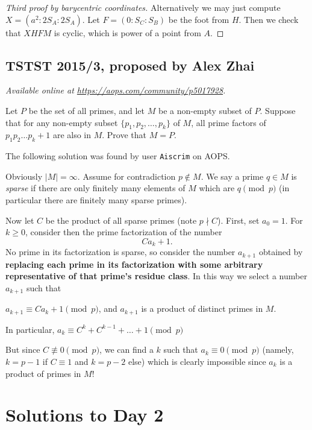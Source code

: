 \documentclass[11pt]{scrartcl}
\begin{document}
\begin{proof}
  [Third proof by barycentric coordinates]
  Alternatively we may just compute $X = (a^2:2S_A:2S_A)$.
  Let $F = (0 : S_C : S_B)$ be the foot from $H$.
  Then we check that $X H F M$ is cyclic,
  which is power of a point from $A$.
\end{proof}
\pagebreak

\subsection{TSTST 2015/3, proposed by Alex Zhai}
\textsl{Available online at \url{https://aops.com/community/p5017928}.}
\begin{mdframed}[style=mdpurplebox,frametitle={Problem statement}]
Let $P$ be the set of all primes, and let $M$ be a
non-empty subset of $P$. Suppose that for any non-empty subset
$\{p_1, p_2, \dots, p_k\}$ of $M$, all prime factors of
$p_1 p_2 \dots p_k + 1$ are also in $M$. Prove that $M = P$.
\end{mdframed}
The following solution was found by user \texttt{Aiscrim} on AOPS.

Obviously $|M| = \infty$.
Assume for contradiction $p \notin M$.
We say a prime $q \in M$ is \emph{sparse}
if there are only finitely many elements of $M$
which are $q \pmod p$
(in particular there are finitely many sparse primes).

Now let $C$ be the product of all sparse primes (note $p \nmid C$).
First, set $a_0 = 1$.
For $k \ge 0$, consider then the prime factorization of the number
\[ Ca_k + 1. \]
No prime in its factorization is sparse,
so consider the number $a_{k+1}$ obtained by
\textbf{replacing each prime in its factorization
with some arbitrary representative of that prime's residue class}.
In this way we select a number $a_{k+1}$ such that
\begin{itemize}
  \ii $a_{k+1} \equiv Ca_k + 1 \pmod p$, and
  \ii $a_{k+1}$ is a product of distinct primes in $M$.
\end{itemize}
In particular, $a_k \equiv C^k + C^{k-1} + \dots + 1 \pmod p$

But since $C \not\equiv 0 \pmod p$,
we can find a $k$ such that $a_k \equiv 0 \pmod p$
(namely, $k=p-1$ if $C \equiv 1$ and $k=p-2$ else)
which is clearly impossible since $a_k$ is a product of primes in $M$!
\pagebreak

\section{Solutions to Day 2}
\end{document}
